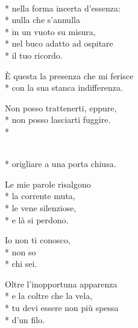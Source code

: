 \documentclass[12pt]{book}
\begin{document}
\begin{poem}{}{}

\settowidth{\versewidth}{mentre la tua nostalgia permane nei laghi  }

\begin{altverse}
\\*
nella forma incerta d'essenza: \\*
nulla che s'annulla  \\*
in un vuoto su misura, \\*
nel buco adatto ad ospitare \\*
il tuo ricordo. 
\end{altverse}

\begin{altverse}
È questa la presenza che mi ferisce \\*
con la sua stanca indifferenza. 
\end{altverse}


\begin{altverse}
Non posso trattenerti, eppure, \\*
non posso lasciarti fuggire.\\*
\end{altverse}


\end{poem}

\begin{poem}{}{}

\settowidth{\versewidth}{mentre la tua nostalgia permane nei laghi  }

\begin{altverse}
 \\*
origliare a una porta chiusa. 
\end{altverse}

\begin{altverse}
Le mie parole risalgono \\*
la corrente muta, \\*
le vene silenziose, \\*
e là si perdono. 
\end{altverse}

\begin{altverse}
Io non ti conosco, \\*
non so \\*
chi sei. 
\end{altverse}

\begin{altverse}
Oltre l'inopportuna apparenza \\*
e la coltre che la vela, \\*
tu devi essere non più spessa \\*
d'un filo. 
\end{altverse}


\end{poem}
\end{document}

